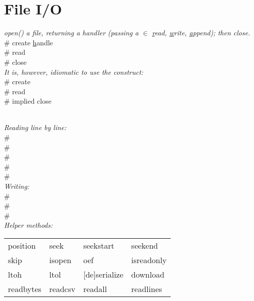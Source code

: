\section{File I/O}

\textit{open() a file, returning a handler (passing a  $\in$ \underline{r}ead, \underline{w}rite, \underline{a}ppend); then close.}\\
 \# create \underline{h}andle \\
 \# read \\
 \# close \\


\textit{It is, however, idiomatic to use the  construct:}\\
 \# create \\
 \# read \\
 \# implied close \\
\


\textit{Reading line by line:}\\
 \#  \\
 \#  \\
 \#  \\
 \#  \\
 \#  \\

\textit{Writing:}\\
 \#  \\
 \#  \\
 \#  \\


\textit{Helper methods:}\\
{\scriptsize 
\begin{tabular}{l l l l}
    position & seek & seekstart & seekend \\
    skip & isopen & oef & isreadonly \\
    ltoh & ltol & [de]serialize &  download \\
    readbytes & readcsv & readall & readlines \\
\end{tabular}} \ \